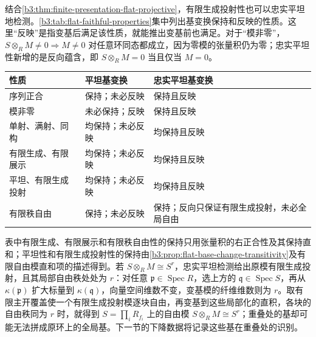 结合\cref{b3:thm:finite-presentation-flat-projective}，有限生成投射性也可以忠实平坦地检测。\cref{b3:tab:flat-faithful-properties}集中列出基变换保持和反映的性质。这里“反映”是指变基后满足该性质，就能推出变基前也满足。对于“模非零”，\(S\otimes_RM\ne0\Rightarrow M\ne0\) 对任意环同态都成立，因为零模的张量积仍为零；忠实平坦性新增的是反向蕴含，即 \(S\otimes_RM=0\) 当且仅当 \(M=0\)。

\begin{center}
	\begin{minipage}{\textwidth}
		\makeatletter
		\def\@captype{table}
		\makeatother
		\centering
		\caption[平坦与忠实平坦基变换的性质检测]{平坦与忠实平坦基变换的性质检测。设 \(R\to S\) 为交换环同态，表中的变基指 \(M\mapsto S\otimes_RM\) 及相应的模同态；模的性质分别相对于 \(R\) 和 \(S\) 而言。}
		\label{b3:tab:flat-faithful-properties}
		\begin{tabularx}{\textwidth}{@{}>{\raggedright\arraybackslash}p{}>{\raggedright\arraybackslash}p{}>{\raggedright\arraybackslash}X@{}}
			\toprule
			性质 & 平坦基变换 & 忠实平坦基变换\\
			\midrule
			序列正合 & 保持；未必反映 & 保持且反映\\
			模非零 & 未必保持；反映 & 保持且反映\\
			单射、满射、同构 & 均保持；未必反映 & 均保持且反映\\
			有限生成、有限展示 & 均保持；未必反映 & 均保持且反映\\
			平坦、有限生成投射 & 均保持；未必反映 & 均保持且反映\\
			有限秩自由 & 保持；未必反映 & 保持；反向只保证有限生成投射，未必全局自由\\
			\bottomrule
		\end{tabularx}
	\end{minipage}
\end{center}

表中有限生成、有限展示和有限秩自由性的保持只用张量积的右正合性及其保持直和；平坦性和有限生成投射性的保持由\cref{b3:prop:flat-base-change-transitivity}及有限自由模直和项的描述得到。若 \(S\otimes_RM\cong S^r\)，忠实平坦检测给出原模有限生成投射，且其局部自由秩处处为 \(r\)：对任意 \(\mathfrak p\in\operatorname{Spec}R\)，选上方的 \(\mathfrak q\in\operatorname{Spec}S\)，再从 \(\kappa(\mathfrak p)\) 扩大标量到 \(\kappa(\mathfrak q)\)，向量空间维数不变，变基模的纤维维数则为 \(r\)。取有限主开覆盖使一个有限生成投射模逐块自由，再变基到这些局部化的直积，各块的自由秩同为 \(r\) 时，就得到 \(S=\prod_iR_{f_i}\) 上的自由模 \(S\otimes_RM\cong S^r\)；重叠处的基却可能无法拼成原环上的全局基。下一节的下降数据将记录这些基在重叠处的识别。

